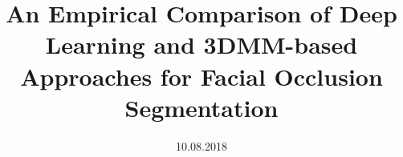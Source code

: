 \documentclass[a4paper, 10pt, oneside]{memoir}
\title				{An Empirical Comparison of Deep Learning and 3DMM-based Approaches for Facial Occlusion Segmentation}
\date				{10.08.2018}
\begin{document}

\thesisfront
\maketitle
\pagestyle{thesis}


\thesistoc
\thesismain





%
%
\thesisappendix
\thesisbib
\begin{appendices}
	 
\end{appendices}
\thesisback

\end{document}
